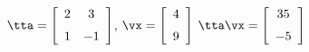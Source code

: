 {$\tta = \left[ \begin {array}{cc} 2&3\\\noalign{\medskip}1&-1\end {array}
 \right]$,\quad 
$\vx = \left[ \begin {array}{c} 4\\\noalign{\medskip}9\end {array} \right] $}
{$\tta\vx= \left[ \begin {array}{c} 35\\\noalign{\medskip}-5\end {array}
 \right]$
}
 
  

  

  


  

  

 

